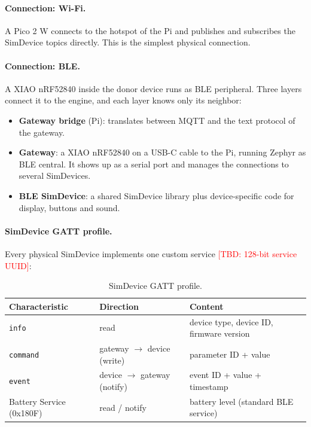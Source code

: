 \documentclass[11pt,a4paper]{article}
\newcommand{\tbd}[1]{\textcolor{red}{[TBD: #1]}}
\begin{document}
\paragraph{Connection: Wi-Fi.} A Pico 2 W connects to the hotspot of the Pi and
publishes and subscribes the SimDevice topics directly. This is the simplest
physical connection.

\paragraph{Connection: BLE.} A XIAO nRF52840 inside the donor device runs as BLE
peripheral. Three layers connect it to the engine, and each layer knows only
its neighbor:
\begin{itemize}
  \item \textbf{Gateway bridge} (Pi): translates between MQTT and the text
        protocol of the gateway.
  \item \textbf{Gateway}: a XIAO nRF52840 on a USB-C cable to the Pi, running
        Zephyr as BLE central. It shows up as a serial port and manages the
        connections to several SimDevices.
  \item \textbf{BLE SimDevice}: a shared SimDevice library plus device-specific
        code for display, buttons and sound.
\end{itemize}

\paragraph{SimDevice GATT profile.} Every physical SimDevice implements one
custom service \tbd{128-bit service UUID}:

\begin{table}[h]
\centering
\small
\begin{tabularx}{\linewidth}{@{}l l X@{}}
\toprule
\textbf{Characteristic} & \textbf{Direction} & \textbf{Content} \\
\midrule
\texttt{info}    & read                              & device type, device ID, firmware version \\
\texttt{command} & gateway $\rightarrow$ device (write) & parameter ID + value \\
\texttt{event}   & device $\rightarrow$ gateway (notify) & event ID + value + timestamp \\
Battery Service (0x180F) & read / notify             & battery level (standard BLE service) \\
\bottomrule
\end{tabularx}
\caption{SimDevice GATT profile.}
\label{tab:gatt}
\end{table}
\end{document}
